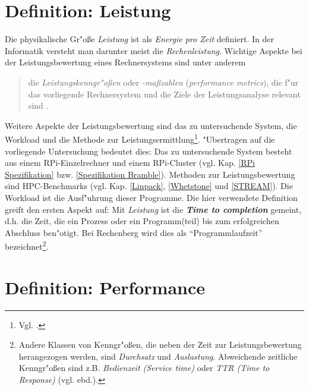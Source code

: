 \section{Definition: Leistung}\label{Leistung}

Die physikalische Gr"o\ss e \textit{Leistung} ist als \textit{Energie pro Zeit} definiert. In der Informatik versteht man darunter meist die \textit{Rechenleistung}. Wichtige Aspekte bei der Leistungsbewertung eines Rechnersystems sind unter anderem
\begin{quote}
\onehalfspacing
[...] die \textit{Leistungskenngr"o\ss en} oder \textit{-ma\ss zahlen} (\textit{performance metrics}), die f"ur das vorliegende Rechnersystem und die Ziele der Leistungsanalyse relevant sind \cite{rec06}.
\end{quote}
Weitere Aspekte der Leistungsbewertung sind das zu untersuchende System, die Workload und die Methode zur Leistungsermittlung\footnote{Vgl. \cite{rec06}.}. "Ubertragen auf die vorliegende Untersuchung bedeutet dies: Das zu untersuchende System besteht aus einem RPi-Einzelrechner und einem RPi-Cluster (vgl. Kap. \ref{RPi Spezifikation} bzw. \ref{Spezifikation Bramble}). Methoden zur Leistungsbewertung sind HPC-Benchmarks (vgl. Kap. \ref{Linpack}, \ref{Whetstone} und \ref{STREAM}). Die Workload ist die Ausf"uhrung dieser Programme. 
Die hier verwendete Definition greift den ersten Aspekt auf: Mit \textit{Leistung} ist die \textbf{\textit{Time to completion}} gemeint, d.h. die Zeit, die ein Prozess oder ein Programm(teil) bis zum erfolgreichen Abschluss ben"otigt. Bei Rechenberg wird dies als "`Programmlaufzeit"' \cite{rec06} bezeichnet\footnote{Andere Klassen von Kenngr"o\ss en, die neben der Zeit zur Leistungsbewertung herangezogen werden, sind \textit{Durchsatz} und \textit{Auslastung}. Abweichende zeitliche Kenngr"o\ss en sind z.B. \textit{Bedienzeit (Service time)} oder \textit{TTR (Time to Response)} (vgl. ebd.).}. 

\section{Definition: Performance}\label{Performance}

